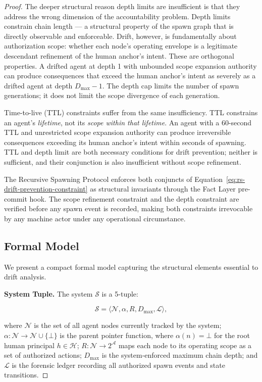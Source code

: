 \begin{proof}
The deeper structural reason depth limits are insufficient is that they address the wrong dimension of the accountability problem. Depth limits constrain chain length — a structural property of the spawn graph that is directly observable and enforceable. Drift, however, is fundamentally about authorization scope: whether each node's operating envelope is a legitimate descendant refinement of the human anchor's intent. These are orthogonal properties. A drifted agent at depth 1 with unbounded scope expansion authority can produce consequences that exceed the human anchor's intent as severely as a drifted agent at depth $D_{\max} - 1$. The depth cap limits the number of spawn generations; it does not limit the scope divergence of each generation.

Time-to-live (TTL) constraints suffer from the same insufficiency. TTL constrains an agent's \emph{lifetime}, not its \emph{scope within that lifetime}. An agent with a 60-second TTL and unrestricted scope expansion authority can produce irreversible consequences exceeding its human anchor's intent within seconds of spawning. TTL and depth limit are both necessary conditions for drift prevention; neither is sufficient, and their conjunction is also insufficient without scope refinement.

The Recursive Spawning Protocol enforces both conjuncts of Equation~\ref{eq:rs-drift-prevention-constraint} as structural invariants through the Fact Layer pre-commit hook. The scope refinement constraint and the depth constraint are verified before any spawn event is recorded, making both constraints irrevocable by any machine actor under any operational circumstance.

\subsection{Formal Model}
\label{sec:rs-drift-model}

We present a compact formal model capturing the structural elements essential to drift analysis.

\medskip
\noindent\textbf{System Tuple.}
The system $\mathcal{S}$ is a 5-tuple:

\begin{equation}
\mathcal{S} = \langle \mathcal{N}, \alpha, R, D_{\max}, \mathcal{L} \rangle,
\label{eq:rs-system-model}
\end{equation}

where $\mathcal{N}$ is the set of all agent nodes currently tracked by the system; $\alpha: \mathcal{N} \rightarrow \mathcal{N} \cup \{\bot\}$ is the parent pointer function, where $\alpha(n) = \bot$ for the root human principal $h \in \mathcal{H}$; $R: \mathcal{N} \rightarrow 2^{\mathcal{A}}$ maps each node to its operating scope as a set of authorized actions; $D_{\max}$ is the system-enforced maximum chain depth; and $\mathcal{L}$ is the forensic ledger recording all authorized spawn events and state transitions.


\end{proof}
